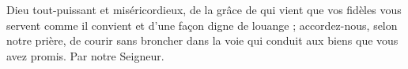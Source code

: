 Dieu tout-puissant et miséricordieux, de la grâce de qui vient que vos fidèles vous servent comme il convient et d’une façon digne de louange ; accordez-nous, selon notre prière, de courir sans broncher dans la voie qui conduit aux biens que vous avez promis. Par notre Seigneur.
